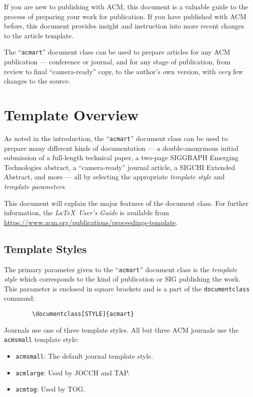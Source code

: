 \documentclass[acmsmall]{acmart}
\begin{document}
	If you are new to publishing with ACM, this document is a valuable
	guide to the process of preparing your work for publication. If you
	have published with ACM before, this document provides insight and
	instruction into more recent changes to the article template.
	
	The ``\verb|acmart|'' document class can be used to prepare articles
	for any ACM publication --- conference or journal, and for any stage
	of publication, from review to final ``camera-ready'' copy, to the
	author's own version, with {\itshape very} few changes to the source.
	
	\section{Template Overview}
	As noted in the introduction, the ``\verb|acmart|'' document class can
	be used to prepare many different kinds of documentation --- a
	double-anonymous initial submission of a full-length technical paper, a
	two-page SIGGRAPH Emerging Technologies abstract, a ``camera-ready''
	journal article, a SIGCHI Extended Abstract, and more --- all by
	selecting the appropriate {\itshape template style} and {\itshape
		template parameters}.
	
	This document will explain the major features of the document
	class. For further information, the {\itshape \LaTeX\ User's Guide} is
	available from
	\url{https://www.acm.org/publications/proceedings-template}.
	
	\subsection{Template Styles}
	
	The primary parameter given to the ``\verb|acmart|'' document class is
	the {\itshape template style} which corresponds to the kind of publication
	or SIG publishing the work. This parameter is enclosed in square
	brackets and is a part of the {\verb|documentclass|} command:
	\begin{verbatim}
		\documentclass[STYLE]{acmart}
	\end{verbatim}
	
	Journals use one of three template styles. All but three ACM journals
	use the {\verb|acmsmall|} template style:
	\begin{itemize}
		\item {\texttt{acmsmall}}: The default journal template style.
		\item {\texttt{acmlarge}}: Used by JOCCH and TAP.
		\item {\texttt{acmtog}}: Used by TOG.
	\end{itemize}
	
\end{document}

